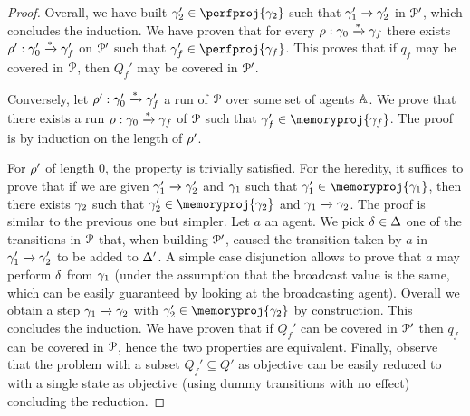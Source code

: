 \begin{proof}
	Overall, we have built $\config_2' \in \perfproj{\config_2}$ such that $\gamma_1' \xrightarrow{} \gamma_2'$ in $\mathcal{P}'$, which concludes the induction. We have proven that for every $\rho: \gamma_0 \xrightarrow{*} \gamma_f$ there exists $\rho': \gamma_0' \xrightarrow{*} \gamma_f'$ on $\mathcal{P}'$ such that $\config_f' \in \perfproj{\config_f}$. This proves that if $q_f$ may be covered in $\mathcal{P}$, then $Q_f'$ may be covered in $\mathcal{P}'$. 

	Conversely, let $\rho' : \gamma_0' \xrightarrow{*} \gamma_f'$ a run of $\mathcal{P}$ over some set of agents $\mathbb{A}$. We prove that there exists a run $\rho: \gamma_0 \xrightarrow{*} \gamma_f$ of $\mathcal{P}$ such that $\config_f' \in \memoryproj{\config_f}$. The proof is by induction on the length of $\rho'$. 

	For $\rho'$ of length $0$, the property is trivially satisfied. For the heredity, it suffices to prove that if we are given $\gamma_1' \xrightarrow{} \gamma_2'$ and $\gamma_1$ such that $\config_1' \in \memoryproj{\config_1}$, then there exists $\gamma_2$ such that $\config_2' \in \memoryproj{\config_2}$ and $\gamma_1 \xrightarrow{} \gamma_2$. The proof is similar to the previous one but simpler. Let $a$ an agent. We pick $\delta \in \Delta$ one of the transitions in $\mathcal{P}$ that, when building $\mathcal{P}'$, caused the transition taken by $a$ in $\gamma_1' \xrightarrow{} \gamma_2'$ to be added to $\Delta'$. A simple case disjunction allows to prove that $a$ may perform $\delta$ from $\gamma_1$ (under the assumption that the broadcast value is the same, which can be easily guaranteed by looking at the broadcasting agent). Overall we obtain a step $\gamma_1 \xrightarrow{} \gamma_2$ with $\config_2' \in \memoryproj{\config_2}$ by construction. This concludes the induction. We have proven that if $Q_f'$ can be covered in $\mathcal{P}'$ then $q_f$ can be covered in $\mathcal{P}$, hence the two properties are equivalent.
	Finally, observe that the \COVER problem with a subset $Q_f' \subseteq Q'$ as objective can be easily reduced to \COVER with a single state as objective (using dummy transitions with no effect) concluding the reduction.
\end{proof}
